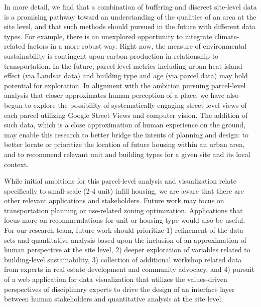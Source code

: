 \documentclass[
]{book}
\begin{document}
In more detail, we find that a combination of buffering and discreet site-level data is a promising pathway toward an understanding of the qualities of an area at the site level, and that such methods should pursued in the future with different data types. For example, there is an unexplored opportunity to integrate climate-related factors in a more robust way. Right now, the measure of environmental sustainability is contingent upon carbon production in relationship to transportation. In the future, parcel level metrics including urban heat island effect (via Landsat data) and building type and age (via parcel data) may hold potential for exploration. In alignment with the ambition pursuing parcel-level analysis that closer approximates human perception of a place, we have also begun to explore the possibility of systematically engaging street level views of each parcel utilizing Google Street Views and computer vision. The addition of such data, which is a close approximation of human experience on the ground, may enable this research to better bridge the intents of planning and design: to better locate or prioritize the location of future housing within an urban area, and to recommend relevant unit and building types for a given site and its local context.

While initial ambitions for this parcel-level analysis and visualization relate specifically to small-scale (2-4 unit) infill housing, we are aware that there are other relevant applications and stakeholders. Future work may focus on transportation planning or use-related zoning optimization. Applications that focus more on recommendations for unit or housing type would also be useful.
For our research team, future work should prioritize 1) refinement of the data sets and quantitative analysis based upon the inclusion of an approximation of human perspective at the site level, 2) deeper exploration of variables related to building-level sustainability, 3) collection of additional workshop related data from experts in real estate development and community advocacy, and 4) pursuit of a web application for data visualization that utilizes the values-driven perspectives of disciplinary experts to drive the design of an interface layer between human stakeholders and quantitative analysis at the site level.
\end{document}

